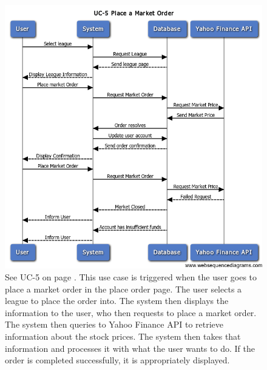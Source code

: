 \begin{figure}[H]
\centering
\includegraphics[width=5.5in]{./img/uc5.png}
\caption{See UC-5 on page \pageref{UC-5}. This use case is triggered when the
user goes to place a market order in the place
order page. The user selects a league to place the order into. The system then
displays the information to the user, who then requests to place a market order.
The system then queries to Yahoo Finance API to retrieve information about the
stock prices. The system then takes that information and processes it with what
the user wants to do. If the order is completed successfully, it is appropriately
displayed.}
\end{figure}

